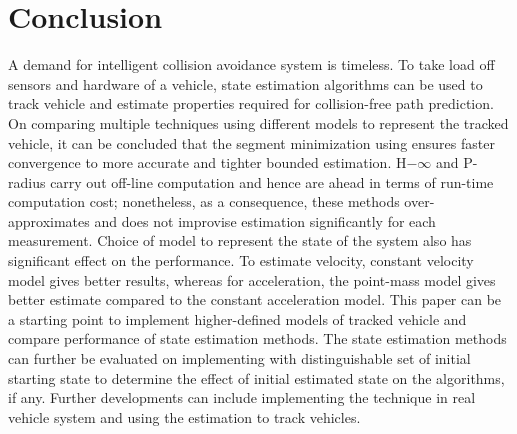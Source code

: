 \chapter{Conclusion} \label{ch:conclusion}
A demand for intelligent collision avoidance system is timeless. To take load off sensors and hardware of a vehicle, state estimation algorithms can be used to track vehicle and estimate properties required for collision-free path prediction. On comparing multiple techniques using different models to represent the tracked vehicle, it can be concluded that the segment minimization using ensures faster convergence to more accurate and tighter bounded estimation. H$-\infty$ and P-radius carry out off-line computation and hence are ahead in terms of run-time computation cost; nonetheless, as a consequence, these methods over-approximates and does not improvise estimation significantly for each measurement. Choice of model to represent the state of the system also has significant effect on the performance. To estimate velocity, constant velocity model gives better results, whereas for acceleration, the point-mass model gives better estimate compared to the constant acceleration model. This paper can be a starting point to implement higher-defined models of tracked vehicle and compare performance of state estimation methods. The state estimation methods can further be evaluated on implementing with distinguishable set of initial starting state to determine the effect of initial estimated state on the algorithms, if any. Further developments can include implementing the technique in real vehicle system and using the estimation to track vehicles.